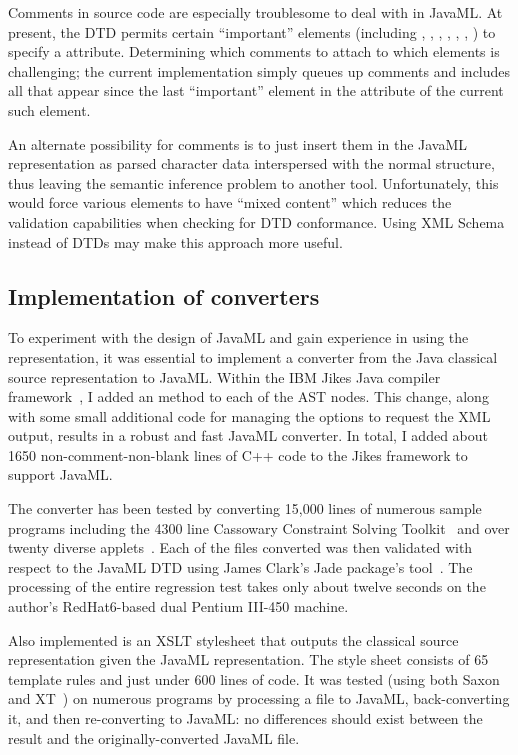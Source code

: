 \documentclass{article}
\begin{document}
\begin{multicols}{2}
Comments in source code are especially troublesome to deal with in
JavaML.  At present, the DTD permits certain ``important'' elements
(including , ,
, , ,
, ) to specify a 
attribute.  Determining which comments to attach to which elements is
challenging; the current implementation simply queues up comments and
includes all that appear since the last ``important'' element in the
 attribute of the current such element.

An alternate possibility for comments is to just insert them in the
JavaML representation as parsed character data interspersed with the
normal structure, thus leaving the semantic inference problem to another
tool.  Unfortunately, this would force various elements to have ``mixed
content'' which reduces the validation capabilities when checking for
DTD conformance.  Using XML Schema~\cite{XMLSchema1} instead of DTDs may
make this approach more useful.


\subsection{Implementation of converters}

To experiment with the design of JavaML and gain experience in using the
representation, it was essential to implement a converter from the Java
classical source representation to JavaML.  Within the IBM Jikes Java
compiler framework~\cite{Jikes}, I added an  method
to each of the AST nodes. This change, along with some small additional
code for managing the options to request the XML output, results in a
robust and fast JavaML converter.  In total, I added about 1650
non-comment-non-blank lines of C++ code to the Jikes framework to
support JavaML.

The converter has been tested by converting 15,000 lines of numerous
sample programs including the 4300 line Cassowary Constraint Solving
Toolkit~\cite{CassoInI} and over twenty diverse applets~\cite{SunApplets}.  Each of
the files converted was then validated with respect to the JavaML DTD
using James Clark's Jade package's  tool~\cite{Jade}.
The processing of the entire regression test takes only about twelve
seconds on the author's RedHat6-based dual Pentium III-450 machine.

Also implemented is an XSLT stylesheet that outputs the classical source
representation given the JavaML representation. The style sheet consists
of 65 template rules and just under 600 lines of code.  It was tested
(using both Saxon~\cite{Saxon} and XT~\cite{Clark-XT}) on numerous programs
by processing a file to JavaML, back-converting it, and then
re-converting to JavaML: no differences should exist between the result
and the originally-converted JavaML file.


\end{multicols}
\end{document}
